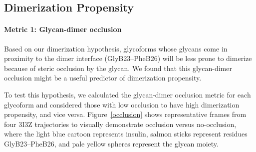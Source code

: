 \documentclass[9pt]{elife}
\begin{document}

\subsection{Dimerization Propensity}
\paragraph{Metric 1: Glycan-dimer occlusion}
Based on our dimerization hypothesis, glycoforms whose glycans come in proximity to the dimer interface (GlyB23--PheB26) will be less prone to dimerize because of steric occlusion by the glycan. We found that this glycan-dimer occlusion might be a useful predictor of dimerization propensity. 

To test this hypothesis, we calculated the glycan-dimer occlusion metric for each glycoform and considered those with low occlusion to have high dimerization propensity, and vice versa. Figure~\ref{occlusion} shows representative frames from four 3I3Z trajectories to visually demonstrate occlusion versus no-occlusion, where the light blue cartoon represents insulin, salmon sticks represent residues GlyB23--PheB26, and pale yellow spheres represent the glycan moiety. 
\end{document}
